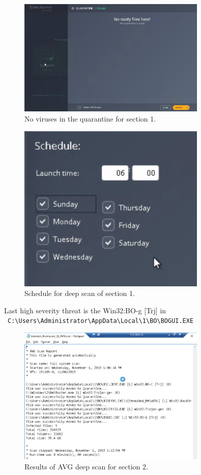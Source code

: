 \documentclass[a4paper]{article}
\begin{document}
	\begin{figure}[ht!]
		\centering
		\includegraphics[width=0.8\textwidth]{1_3_5}
		\caption{No viruses in the quarantine for section 1.}
		\label{fig:1_3_5}
	\end{figure}

	\begin{figure}[ht!]
		\centering
		\includegraphics[width=0.8\textwidth]{1_3_12}
		\caption{Schedule for deep scan of section 1.}
		\label{fig:1_3_12}
	\end{figure}

	Last high severity threat is the Win32:BO-g [Trj] in\\ 
	\ \verb|C:\Users\Administrator\AppData\Local\1\BO\BOGUI.EXE|
	\begin{figure}[ht!]
		\centering
		\includegraphics[width=0.8\textwidth]{2_1_13}
		\caption{Results of AVG deep scan for section 2.}
		\label{fig:2_1_13}
	\end{figure}
\end{document}
